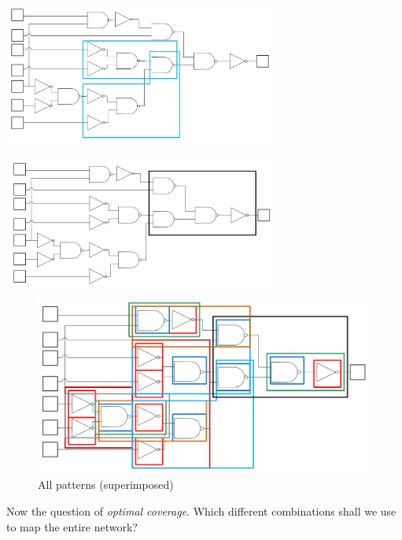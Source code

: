 \documentclass{article}
\begin{document}
\vspace{1cm}
\begin{minipage}[t]{0.5\textwidth}
    \centering
    \includegraphics[width=9cm, scale=1]{S4/oai21_pattern.PNG}
    \captionsetup{justification=centering}
\end{minipage}%
\begin{minipage}[t]{0.5\textwidth}
    \centering
    \includegraphics[width=9cm, scale=1]{S4/aoi22_pattern.PNG}
    \captionsetup{justification=centering}
\end{minipage}%

\newpage
\begin{figure}[htp]
    \centering
    \includegraphics[width=20cm, scale=1]{S4/all_pattern.PNG}
    \caption{All patterns (superimposed)}
\end{figure}

Now the question of \textit{optimal coverage}. Which different combinations shall we use to map the entire network?
\end{document}
